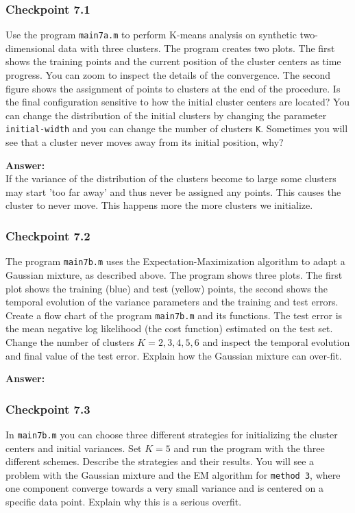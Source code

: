 \documentclass[times,12pt]{article}    %
\begin{document}
\subsubsection*{Checkpoint 7.1}

Use the program {\tt main7a.m} to perform K-means analysis on
synthetic two-dimensional data with three clusters. The program
creates two plots. The first shows the training points and the
current position of the cluster centers as time progress. You can
zoom to inspect the details of the convergence. The second figure
shows the assignment of points to clusters at the end of the
procedure. Is the final configuration sensitive to how the initial
cluster centers are located? You can change the distribution of
the initial clusters by changing the parameter {\tt initial-width}
and you can change the number of clusters {\tt K}. Sometimes you
will see that a cluster never moves away from its initial
position, why?

\noindent \textbf{Answer:}\\
\noindent If the variance of the distribution of the clusters become to large some clusters may start 'too far away' and thus never be assigned any points. This causes the cluster to never move. This happens more the more clusters we initialize.

\subsubsection*{Checkpoint 7.2}

The program {\tt main7b.m} uses the Expectation-Maximization
algorithm to adapt a Gaussian mixture, as described above. The
program shows three plots. The first plot shows the training (blue)
and test (yellow) points, the second shows the temporal evolution
of the variance parameters and the training and test errors.
Create a flow chart of the program {\tt main7b.m} and its
functions. The test error is the mean negative log likelihood (the
cost function) estimated on the test set. Change the number of
clusters $K=2,3,4,5,6$ and inspect the temporal evolution and
final value of the test error. Explain how the Gaussian mixture
can over-fit.

\noindent \textbf{Answer:}\\
\noindent 



\subsubsection*{Checkpoint 7.3}
In {\tt main7b.m} you can choose three different strategies for
initializing the cluster centers and initial variances.
 Set $K=5$ and run the program with the three different schemes. Describe the
strategies and their results. You will see a problem with the Gaussian mixture and
the EM algorithm for {\tt method 3}, where one component converge towards a very small variance
and is centered on a specific data point. Explain why this is a serious overfit.
\end{document}
